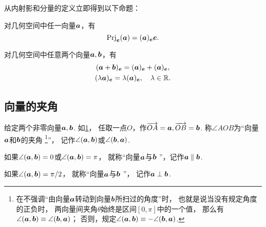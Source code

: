 从内射影和分量的定义立即得到以下命题：
\begin{theorem}
对几何空间中任一向量\(\boldsymbol{a}\)，有\[
	\operatorname{Prj}_{\boldsymbol{e}}(\boldsymbol{a})
	= (\boldsymbol{a})_{\boldsymbol{e}} \boldsymbol{e}.
\]
\end{theorem}

\begin{theorem}
对几何空间中任意两个向量\(\boldsymbol{a},\boldsymbol{b}\)，有\begin{gather}
	(\boldsymbol{a}+\boldsymbol{b})_{\boldsymbol{e}}
	= (\boldsymbol{a})_{\boldsymbol{e}}
	+ (\boldsymbol{a})_{\boldsymbol{e}}, \\
	(\lambda \boldsymbol{a})_{\boldsymbol{e}}
	= \lambda (\boldsymbol{a})_{\boldsymbol{e}},
	\quad\lambda\in\mathbb{R}.
\end{gather}
\end{theorem}

\subsection{向量的夹角}

\begin{definition}
给定两个非零向量\(\boldsymbol{a},\boldsymbol{b}\).
如\cref{figure:解析几何.向量的夹角}，
任取一点\(O\)，作\(\overrightarrow{OA}=\boldsymbol{a},\overrightarrow{OB}=\boldsymbol{b}\).
称\(\angle{AOB}\)为“向量\(\boldsymbol{a}\)和\(\boldsymbol{b}\)的夹角%
\footnote{%
在不强调“由向量\(\boldsymbol{a}\)转动到向量\(\boldsymbol{b}\)所扫过的角度”时，%
也就是说当没有规定角度的正负时，%
两向量间夹角\(\theta\)始终是区间\([0,\pi]\)中的一个值，%
那么有\(\angle(\boldsymbol{a},\boldsymbol{b}) \equiv \angle(\boldsymbol{b},\boldsymbol{a})\)；%
否则，规定\(\angle(\boldsymbol{a},\boldsymbol{b}) \equiv -\angle(\boldsymbol{b},\boldsymbol{a})\).%
}”，%
记作\(\angle(\boldsymbol{a},\boldsymbol{b})\)或\(\angle(\boldsymbol{b},\boldsymbol{a})\).

\begin{figure}[ht]
\centering
{}
\caption{}
\label{figure:解析几何.向量的夹角}
\end{figure}

如果\(\angle(\boldsymbol{a},\boldsymbol{b}) = 0\)或\(\angle(\boldsymbol{a},\boldsymbol{b}) = \pi\)，%
就称“向量\(\boldsymbol{a}\)与\(\boldsymbol{b}\) ”，记作\(\boldsymbol{a}\parallel\boldsymbol{b}\).

如果\(\angle(\boldsymbol{a},\boldsymbol{b}) = \pi/2\)，%
就称“向量\(\boldsymbol{a}\)与\(\boldsymbol{b}\) ”，%
记作\(\boldsymbol{a}\perp\boldsymbol{b}\).
\end{definition}

